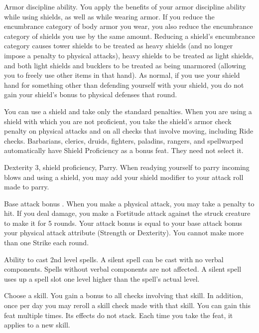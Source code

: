 \featpre Armor discipline ability.
\featben You apply the benefits of your armor discipline ability while using shields, as well as while wearing armor. If you reduce the encumbrance category of body armor you wear, you also reduce the encumbrance category of shields you use by the same amount. Reducing a shield's encumbrance category causes tower shields to be treated as heavy shields (and no longer impose a  penalty to physical attacks), heavy shields to be treated as light shields, and both light shields and bucklers to be treated as being unarmored (allowing you to freely use other items in that hand). As normal, if you use your shield hand for something other than defending yourself with your shield, you do not gain your shield's bonus to physical defenses that round.

 You can use a shield and take only the standard penalties.
 When you are using a shield with which you are not proficient, you take the shield's armor check penalty on physical attacks and on all checks that involve moving, including Ride checks.
 Barbarians, clerics, druids, fighters, paladins, rangers, and spellwarped automatically have Shield Proficiency as a bonus feat. They need not select it.

\featpres Dexterity 3, shield proficiency, Parry.
\featben When readying yourself to parry incoming blows and using a shield, you may add your shield modifier to your attack roll made to parry.

\featpre Base attack bonus .
\featben When you make a physical attack, you may take a  penalty to hit. If you deal damage, you make a Fortitude attack against the struck creature to make it \sickened for 5 rounds. Your attack bonus is equal to your base attack bonus \add your physical attack attribute (Strength or Dexterity). You cannot make more than one Strike each round.

 Ability to cast 2nd level spells.
 A silent spell can be cast with no verbal components. Spells without verbal components are not affected. A silent spell uses up a spell slot one level higher than the spell's actual level.

Choose a skill.
 You gain a  bonus to all checks involving that skill. In addition, once per day you may reroll a skill check made with that skill.
 You can gain this feat multiple times. Its effects do not stack. Each time you take the feat, it applies to a new skill.

